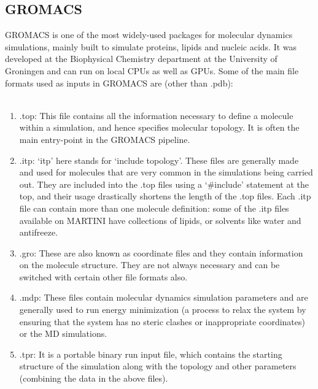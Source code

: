 \documentclass[12pt, a4paper]{report}
\begin{document}
\subsection*{GROMACS} 


GROMACS is one of the most widely-used packages for molecular dynamics simulations, mainly built to simulate proteins, lipids and nucleic acids. It was developed at the Biophysical Chemistry department at the University of Groningen and can run on local CPUs as well as GPUs. Some of the main file formats used as inputs in GROMACS are (other than .pdb): 
\\~\\ 
\begin{enumerate}
    \item .top: This file contains all the information necessary to define a molecule within a simulation, and hence specifies molecular topology. It is often the main entry-point in the GROMACS pipeline. 
    \item .itp: ‘itp’ here stands for ‘include topology’. These files are generally made and used for molecules that are very common in the simulations being carried out. They are included into the .top files using a ‘\#include’ statement at the top, and their usage drastically shortens the length of the .top files. Each .itp file can contain more than one molecule definition: some of the .itp files available on MARTINI have collections of lipids, or solvents like water and antifreeze. 
    \item .gro: These are also known as coordinate files and they contain information on the molecule structure. They are not always necessary and can be switched with certain other file formats also. 
    \item .mdp: These files contain molecular dynamics simulation parameters and are generally used to run energy minimization (a process to relax the system by ensuring that the system has no steric clashes or inappropriate coordinates) or the MD simulations. 
    \item .tpr: It is a portable binary run input file, which contains the starting structure of the simulation along with the topology and other parameters (combining the data in the above files). 
\end{enumerate} 
\end{document}
